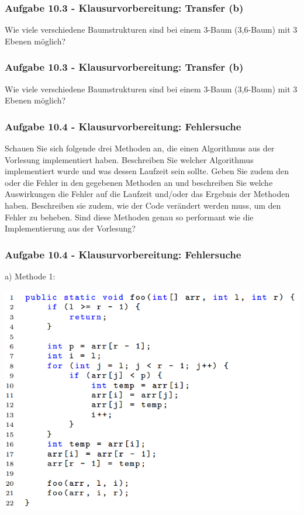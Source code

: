 \documentclass{beamer}
\begin{document}
\begin{frame}[t]
  \frametitle{Aufgabe 10.3 - Klausurvorbereitung: Transfer (b)}

  Wie viele verschiedene Baumstrukturen sind bei einem $3$-Baum ($3$,$6$-Baum) mit $3$ Ebenen möglich?
\end{frame}

\begin{frame}[t]
  \frametitle{Aufgabe 10.3 - Klausurvorbereitung: Transfer (b)}

  Wie viele verschiedene Baumstrukturen sind bei einem $3$-Baum ($3$,$6$-Baum) mit $3$ Ebenen möglich?
\end{frame}

\begin{frame}
  \frametitle{Aufgabe 10.4 - Klausurvorbereitung: Fehlersuche}

  Schauen Sie sich folgende drei Methoden an, die einen Algorithmus aus der Vorlesung implementiert haben. Beschreiben Sie welcher Algorithmus implementiert wurde und was dessen
  Laufzeit sein sollte. Geben Sie zudem den oder die Fehler in den gegebenen Methoden an
  und beschreiben Sie welche Auswirkungen die Fehler auf die Laufzeit und/oder das Ergebnis
  der Methoden haben. Beschreiben sie zudem, wie der Code verändert werden muss, um den
  Fehler zu beheben. Sind diese Methoden genau so performant wie die Implementierung aus
  der Vorlesung?
\end{frame}

\begin{frame}
  \frametitle{Aufgabe 10.4 - Klausurvorbereitung: Fehlersuche}
  \small
  a) Methode 1:

  \includegraphics[scale=0.45]{images/10_4_a.png}
\end{frame}
\end{document}
